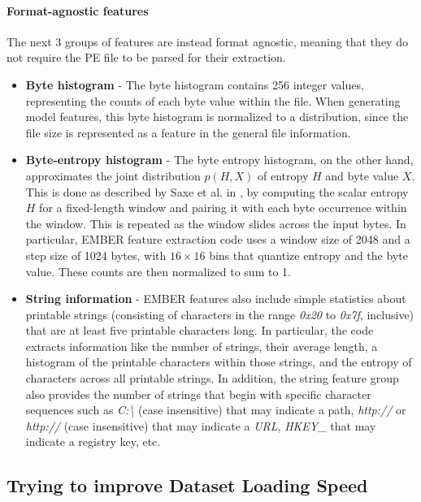 \documentclass[pdfa%
,cucitura%
]{toptesi}
\begin{document}
\paragraph{Format-agnostic features}
The next 3 groups of features are instead format agnostic, meaning that they do not require the PE file to be parsed for their extraction.

\begin{itemize}
	\item \textbf{Byte histogram} - The byte histogram contains 256 integer values, representing the counts of each byte value within the file. When generating model features, this byte histogram is normalized to a distribution, since the file size is represented as a feature in the general file information.
	
	\item \textbf{Byte-entropy histogram} - The byte entropy histogram, on the other hand, approximates the joint distribution $p(H, X)$ of entropy $H$ and byte value $X$. This is done as described by Saxe et al. in \cite{saxeDNNBMDUTDBPF}, by computing the scalar entropy $H$ for a fixed-length window and pairing it with each byte occurrence within the window. This is repeated as the window slides across the input bytes. In particular, EMBER feature extraction code uses a window size of 2048 and a step size of 1024 bytes, with $16 \times 16$ bins that quantize entropy and the byte value. These counts are then normalized to sum to 1.
	
	\item \textbf{String information} - EMBER features also include simple statistics about printable strings (consisting of characters in the range \textit{0x20} to \textit{0x7f}, inclusive) that are at least five printable characters long. In particular, the code extracts information like the number of strings, their average length, a histogram of the printable characters within those strings, and the entropy of characters across all printable strings. In addition, the string feature group also provides the number of strings that begin with specific character sequences such as \textit{C:\textbackslash} (case insensitive) that may indicate a path, \textit{http://} or \textit{http://} (case insensitive) that may indicate a \textit{URL}, \textit{HKEY\_} that may indicate a registry key, etc.
\end{itemize}

\subsection{Trying to improve Dataset Loading Speed}
\end{document}
